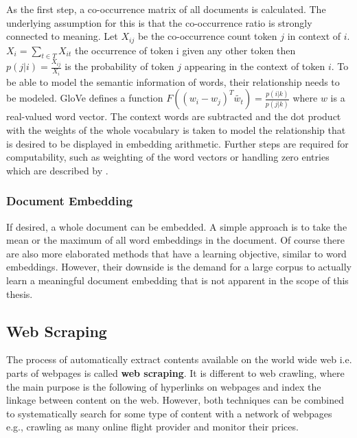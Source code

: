 As the first step, a co-occurrence matrix of all documents is calculated. The underlying assumption for this is that the co-occurrence ratio is strongly connected to meaning.
Let $X_{ij}$ be the co-occurrence count token $j$ in context of $i$. $X_i = \sum_{t \in T} X_{it}$ the occurrence of token i given any other token then $p(j|i) = \frac{X_{ij}}{X_i}$ is the probability of token $j$ appearing in the context of token $i$.
To be able to model the semantic information of words, their relationship needs to be modeled. GloVe defines a function $F((w_i-w_j)^T \widetilde{w_t}) = \frac{p(i|k)}{p(j|k)}$ where $w$ is a real-valued word vector. The context words are subtracted and the dot product with the weights of the whole vocabulary is taken to model the relationship that is desired to be displayed in embedding arithmetic. Further steps are required for computability, such as weighting of the word vectors or handling zero entries which are described by \cite{Pennington2014}.


\subsubsection{Document Embedding}

If desired, a whole document can be embedded. A simple approach is to take the mean or the maximum of all word embeddings in the document. Of course there are also more elaborated methods \citep{Wu2018, Liu2018, Andrew2015} that have a learning objective, similar to word embeddings. However, their downside is the demand for a large corpus to actually learn a meaningful document embedding that is not apparent in the scope of this thesis.

\subsection{Web Scraping}

The process of automatically extract contents available on the world wide web i.e. parts of webpages is called \textbf{web scraping}. It is different to web crawling, where the main purpose is the following of hyperlinks on webpages and index the linkage between content on the web. However, both techniques can be combined to systematically search for some type of content with a network of webpages e.g., crawling as many online flight provider and monitor their prices.

